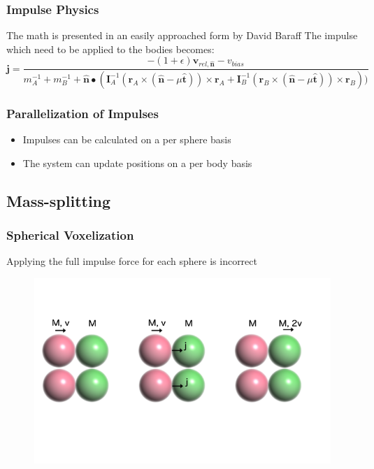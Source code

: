 \documentclass{beamer}
\let\cross\times
\let\vec\boldsymbol
\begin{document}

	\begin{frame}
		\frametitle{Impulse Physics}
		The math is presented in an easily approached form by David Baraff
		The impulse which need to be applied to the bodies becomes:\\
		\small
		\begin{equation*}
			\vec{j} = \frac{-(1+\epsilon)\vec{v}_{rel,\vec{\hat{n}}}-v_{bias}}
			{m_A^{-1}+m_B^{-1}+\vec{\hat{n}}\bullet(\vec{I}_A^{-1}(\vec{r}_A\cross(\vec{\hat{n}}-\mu\vec{\hat{t}}))\cross\vec{r}_A
			+\vec{I}_B^{-1}(\vec{r}_B\cross(\vec{\hat{n}}-\mu\vec{\hat{t}}))\cross\vec{r}_B))}
		\end{equation*}
		\normalsize

	\end{frame}


	\begin{frame}
		\frametitle{Parallelization of Impulses}
		\begin{itemize}
			\item Impulses can be calculated on a per sphere basis
			\item The system can update positions on a per body basis
		\end{itemize}
	\end{frame}


	\subsection{Mass-splitting}
	\begin{frame}
		\frametitle{Spherical Voxelization}
		Applying the full impulse force for each sphere is incorrect
		\begin{figure}
			\includegraphics[width=0.8\linewidth]{fig/ballsNoMassSplit.png}
		\end{figure}
	\end{frame}
\end{document}
